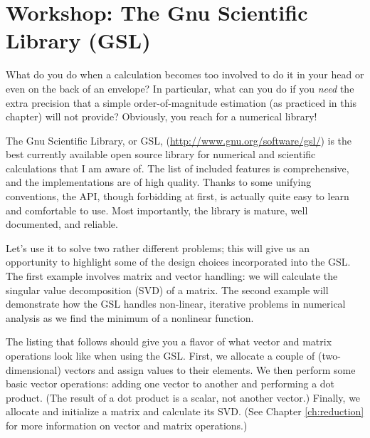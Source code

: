 \section{Workshop: The Gnu Scientific Library (GSL)}


What do you do when a calculation becomes too involved to do it in
your head or even on the back of an envelope? In particular, what can
you do if you \emph{need} the extra precision that a simple
order-of-magnitude estimation (as practiced in this chapter) will not
provide? Obviously, you reach for a numerical library!

The Gnu Scientific Library, or GSL, 
(\url{http://www.gnu.org/software/gsl/}) is the best currently available open
source library for numerical and scientific calculations that I am
aware of. The list of included features is comprehensive, and the
implementations are of high quality. Thanks to some unifying
conventions, the API, though forbidding at first, is actually quite
easy to learn and comfortable to use. Most importantly, the library is
mature, well documented, and reliable.

Let's use it to solve two rather different problems; this will give us
an opportunity to highlight some of the design choices incorporated
into the GSL.  The first example involves matrix and vector handling:
we will calculate the singular value decomposition (SVD) of a matrix.
The second example will demonstrate how the GSL handles non-linear,
iterative problems in numerical analysis as we find the minimum of a
nonlinear function.

The listing that follows should give you a flavor of what vector and
matrix operations look like when using the GSL. First, we allocate a
couple of (two-dimensional) vectors and assign values to their
elements. We then perform some basic vector operations: adding one
vector to another and performing a dot product. (The result of a dot
product is a scalar, not another vector.) Finally, we allocate and
initialize a matrix and calculate its SVD. (See Chapter
\ref{ch:reduction} for more information on vector and matrix
operations.)\vspace*{6pt}

